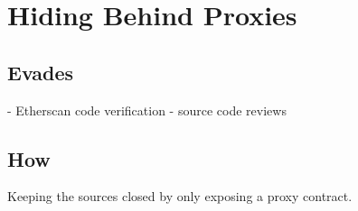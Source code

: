 \section{Hiding Behind Proxies}

\subsection{Evades}

- Etherscan code verification
- source code reviews

\subsection{How}

Keeping the sources closed by only exposing a proxy contract.
